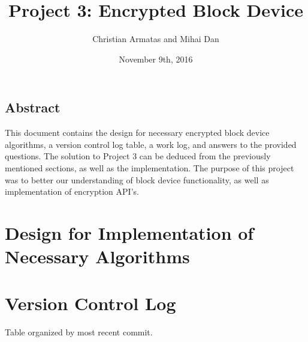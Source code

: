 \documentclass[letterpaper,10pt,onecolumn]{IEEEtran}
\title{Project 3: Encrypted Block Device}
\author{Christian Armatas and Mihai Dan}
\date{November 9th, 2016}
\begin{document}
    \begin{center}
        \begin{minipage}[h]{\textwidth}
            \maketitle
        \end{minipage}
    \end{center}
    
    \vspace{140mm}
    
    \begin{center}
        \section*{Abstract}
        This document contains the design for necessary encrypted block device algorithms, a version control log table, a work log, and answers to the provided questions. The solution to Project 3 can be deduced from the previously mentioned sections, as well as the implementation. The purpose of this project was to better our understanding of block device functionality, as well as implementation of encryption API's.
    \end{center}
    
    
    \newpage
    
    
    \section*{Design for Implementation of Necessary Algorithms}


    \vspace{6mm}
    
    
    \section*{Version Control Log}
        \begin{center}
            Table organized by most recent commit.
        \end{center}
        
        \vspace{1mm}
        
\end{document}
